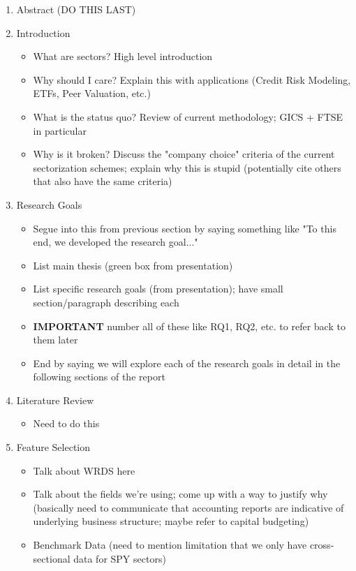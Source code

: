 \documentclass[../main.tex]{subfiles}
\begin{document}
\begin{enumerate}
    \item Abstract (DO THIS LAST)

    \item Introduction
    \begin{itemize}
        \item What are sectors? High level introduction
        \item Why should I care? Explain this with applications (Credit Risk Modeling, ETFs, Peer Valuation, etc.)
        \item What is the status quo? Review of current methodology; GICS + FTSE in particular
        \item Why is it broken? Discuss the "company choice" criteria of the current sectorization schemes; explain why this is stupid (potentially cite others that also have the same criteria)
    \end{itemize}
    
    \item Research Goals
    \begin{itemize}
        \item Segue into this from previous section by saying something like "To this end, we developed the research goal..."
        \item List main thesis (green box from presentation)
        \item List specific research goals (from presentation); have small section/paragraph describing each
        \item \textbf{IMPORTANT} number all of these like RQ1, RQ2, etc. to refer back to them later
        \item End by saying we will explore each of the research goals in detail in the following sections of the report
    \end{itemize}

    \item Literature Review
    \begin{itemize}
        \item Need to do this
    \end{itemize}
    
    \item Feature Selection
    \begin{itemize}
        \item Talk about WRDS here
        \item Talk about the fields we're using; come up with a way to justify why (basically need to communicate that accounting reports are indicative of underlying business structure; maybe refer to capital budgeting)
        \item Benchmark Data (need to mention limitation that we only have cross-sectional data for SPY sectors)
    \end{itemize}
    

\end{enumerate}
\end{document}
